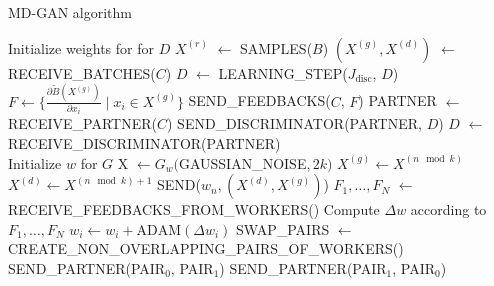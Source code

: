 \begin{algorithm}[H]
    \caption{MD-GAN algorithm}
    \begin{algorithmic}[1]
        \State Initialize weights for for $D$
            \State $X^{(r)}$ $\gets$ SAMPLES($B$)
            \State $(X^{(g)}, X^{(d)})$ $\gets$ RECEIVE\_BATCHES($C$)
                \State $D$ $\gets$ LEARNING\_STEP($J_{\text{disc}}$, $D$)
            \EndFor
            \State $F \gets \{\frac{\partial \tilde{B}(X^{(g)})}{\partial x_i} \mid x_i \in X^{(g)} \}$
            \State SEND\_FEEDBACKS($C$, $F$)
                \State PARTNER $\gets$ RECEIVE\_PARTNER($C$)
                \State SEND\_DISCRIMINATOR(PARTNER, $D$)
                \State $D$ $\gets$ RECEIVE\_DISCRIMINATOR(PARTNER)
            \EndIf
        \EndFor
    \EndProcedure
    \\
        \State Initialize $w$ for $G$
            \State X $\gets G_w($GAUSSIAN\_NOISE$, 2k)$
                \State $X^{(g)} \gets X^{(n \mod k)}$
                \State $X^{(d)} \gets X^{(n \mod k)+1}$
                \State SEND($w_n, (X^{(d)}, X^{(g)})$)
            \EndFor
        \EndFor
        \State $F_1, \dots, F_N$ $\gets$ RECEIVE\_FEEDBACKS\_FROM\_WORKERS()
        \State Compute $\Delta w$ according to $F_1, \dots, F_N$
            \State $w_i \gets w_i + \text{ADAM}(\Delta w_i)$
        \EndFor
            \State SWAP\_PAIRS $\gets$ CREATE\_NON\_OVERLAPPING\_PAIRS\_OF\_WORKERS()
                \State SEND\_PARTNER(PAIR$_0$, PAIR$_1$)
                \State SEND\_PARTNER(PAIR$_1$, PAIR$_0$)
            \EndFor
        \EndIf
    \EndProcedure
    \end{algorithmic}
\end{algorithm}
